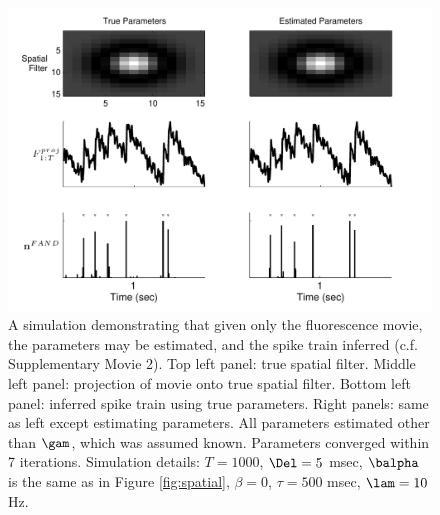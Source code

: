 \begin{figure}[H]
\centering \includegraphics[width=.9\linewidth]{../figs/spatial_EM}
\caption{A simulation demonstrating that given only the fluorescence movie, the parameters may be estimated, and the spike train inferred (c.f. Supplementary Movie 2). Top left panel: true spatial filter.  Middle left panel: projection of movie onto true spatial filter. Bottom left panel: inferred spike train using true parameters. Right panels: same as left except estimating parameters.  All parameters estimated other than $\gam$, which was assumed known.  Parameters converged within 7 iterations.  Simulation details: $T=1000$, $\Del=5$ msec, $\balpha$ is the same as in Figure \ref{fig:spatial}, $\beta=0$, $\tau=500$ msec, $\lam=10$ Hz.} \label{fig:spatial_EM}
\end{figure}

